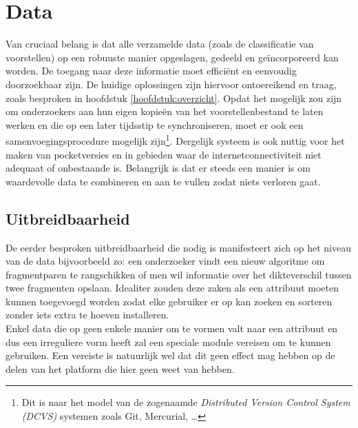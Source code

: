 \section{Data}
Van cruciaal belang is dat alle verzamelde data (zoals de classificatie van voorstellen) op een robuuste manier opgeslagen, gedeeld en ge\"incorporeerd kan worden. De toegang naar deze informatie moet effici\"ent en eenvoudig doorzoekbaar zijn. De huidige oplossingen zijn hiervoor ontoereikend en traag, zoals besproken in hoofdstuk \ref{hoofdstuk:overzicht}. Opdat het mogelijk zou zijn om onderzoekers aan hun eigen kopie\"en van het voorstellenbestand te laten werken en die op een later tijdsstip te synchroniseren, moet er ook een samenvoegingsprocedure mogelijk zijn\footnote{Dit is naar het model van de zogenaamde \emph{Distributed Version Control System (DCVS)} systemen zoals Git, Mercurial, \ldots}. Dergelijk systeem is ook nuttig voor het maken van pocketversies en in gebieden waar de internetconnectiviteit niet adequaat of onbestaande is. Belangrijk is dat er steeds een manier is om waardevolle data te combineren en aan te vullen zodat niets verloren gaat.\\


\subsection{Uitbreidbaarheid}
De eerder besproken uitbreidbaarheid die nodig is manifesteert zich op het niveau van de data bijvoorbeeld zo: een onderzoeker vindt een nieuw algoritme om fragmentparen te rangschikken of men wil informatie over het dikteverschil tussen twee fragmenten opslaan. Idealiter zouden deze zaken als een attribuut moeten kunnen toegevoegd worden zodat elke gebruiker er op kan zoeken en sorteren zonder iets extra te hoeven installeren.\\
 
Enkel data die op geen enkele manier om te vormen valt naar een attribuut en dus een irreguliere vorm heeft zal een speciale module vereisen om te kunnen gebruiken. Een vereiste is natuurlijk wel dat dit geen effect mag hebben op de delen van het platform die hier geen weet van hebben.
 
